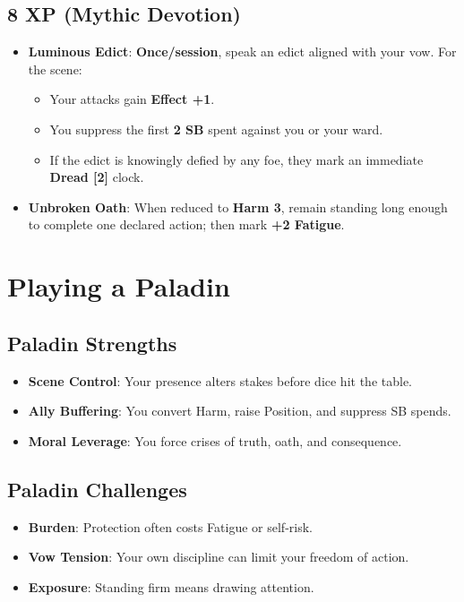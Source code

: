 \documentclass[11pt]{book}
\begin{document}
\subsection*{8 XP (Mythic Devotion)}
\begin{itemize}
  \item \textbf{Luminous Edict}: \textbf{Once/session}, speak an edict aligned with your vow.
    For the scene:  
    \begin{itemize}
      \item Your attacks gain \textbf{Effect +1}.  
      \item You suppress the first \textbf{2 SB} spent against you or your ward.  
      \item If the edict is knowingly defied by any foe, they mark an immediate
        \textbf{Dread [2]} clock.  
    \end{itemize}
  \item \textbf{Unbroken Oath}: When reduced to \textbf{Harm 3}, remain standing long
    enough to complete one declared action; then mark \textbf{+2 Fatigue}.
\end{itemize}

\section{Playing a Paladin}
\subsection{Paladin Strengths}
\begin{itemize}
  \item \textbf{Scene Control}: Your presence alters stakes before dice hit the table.
  \item \textbf{Ally Buffering}: You convert Harm, raise Position, and suppress SB spends.
  \item \textbf{Moral Leverage}: You force crises of truth, oath, and consequence.
\end{itemize}

\subsection{Paladin Challenges}
\begin{itemize}
  \item \textbf{Burden}: Protection often costs Fatigue or self-risk.
  \item \textbf{Vow Tension}: Your own discipline can limit your freedom of action.
  \item \textbf{Exposure}: Standing firm means drawing attention.
\end{itemize}
\end{document}

